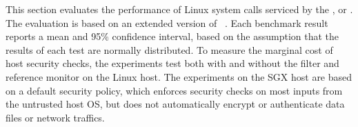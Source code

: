 This section evaluates the performance
of Linux system calls
serviced by the \graphene{} \libos{}, or \thelibos{}.
The evaluation is based on
an extended version of \lmbenchwithver{}~\cite{McVoy:lmbench}.
Each benchmark result
reports a mean and 95\% confidence interval,
based on the assumption
that the results of each test are normally distributed.
To measure the marginal cost of host security checks,
the experiments test both with
and without the \seccomp{} filter and reference monitor
on the Linux host.
The experiments on the SGX host are based on a default security policy,
which enforces security checks on most inputs from the untrusted host OS,
but does not automatically encrypt or authenticate
data files or network traffics. 

